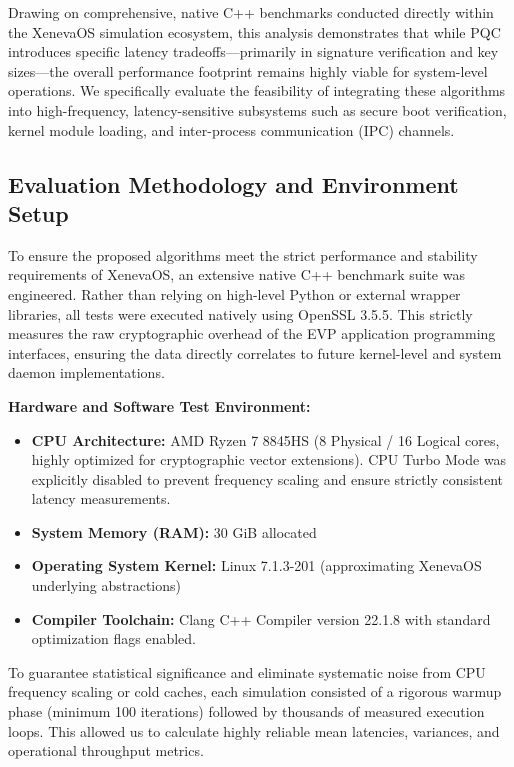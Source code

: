 \documentclass[11pt, a4paper]{article}
\begin{document}
Drawing on comprehensive, native C++ benchmarks conducted directly within the XenevaOS simulation ecosystem, this analysis demonstrates that while PQC introduces specific latency tradeoffs—primarily in signature verification and key sizes—the overall performance footprint remains highly viable for system-level operations. We specifically evaluate the feasibility of integrating these algorithms into high-frequency, latency-sensitive subsystems such as secure boot verification, kernel module loading, and inter-process communication (IPC) channels.

\subsection{Evaluation Methodology and Environment Setup}
To ensure the proposed algorithms meet the strict performance and stability requirements of XenevaOS, an extensive native C++ benchmark suite was engineered. Rather than relying on high-level Python or external wrapper libraries, all tests were executed natively using OpenSSL 3.5.5. This strictly measures the raw cryptographic overhead of the EVP application programming interfaces, ensuring the data directly correlates to future kernel-level and system daemon implementations.

\textbf{Hardware and Software Test Environment:}
\begin{itemize}
    \item \textbf{CPU Architecture:} AMD Ryzen 7 8845HS (8 Physical / 16 Logical cores, highly optimized for cryptographic vector extensions). CPU Turbo Mode was explicitly disabled to prevent frequency scaling and ensure strictly consistent latency measurements.
    \item \textbf{System Memory (RAM):} 30 GiB allocated
    \item \textbf{Operating System Kernel:} Linux 7.1.3-201 (approximating XenevaOS underlying abstractions)
    \item \textbf{Compiler Toolchain:} Clang C++ Compiler version 22.1.8 with standard optimization flags enabled.
\end{itemize}

To guarantee statistical significance and eliminate systematic noise from CPU frequency scaling or cold caches, each simulation consisted of a rigorous warmup phase (minimum 100 iterations) followed by thousands of measured execution loops. This allowed us to calculate highly reliable mean latencies, variances, and operational throughput metrics.
\end{document}
